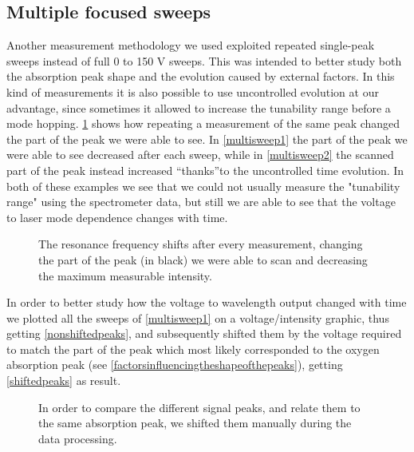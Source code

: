 	\subsection{Multiple focused sweeps}\label{focus}
Another measurement methodology we used exploited repeated single-peak sweeps instead of 
full 0 to 150 V sweeps. This was intended to better study both the absorption peak shape and the evolution caused by external factors. In this kind of measurements it is also possible to use uncontrolled evolution at our advantage, since sometimes it allowed to increase the tunability range before a mode hopping. \cref{multisweep} shows how repeating a measurement of the same peak changed the part of the peak we were able to see. In \cref{multisweep1} the part of the peak we were able to see decreased after each sweep, while in \cref{multisweep2} the scanned part of the peak instead increased \textquotedblleft thanks\textquotedblright to the uncontrolled time evolution.
In both of these examples we see that we could not usually measure the "tunability range" using the spectrometer data, but still we are able to see that the voltage to laser mode dependence changes with time. 

\begin{figure}[!phtb]\centering
{}
\caption{The resonance frequency shifts after every measurement, changing the part of the peak (in black) we were able to scan and decreasing the maximum measurable intensity.}
\label{multisweep}
\end{figure}

In order to better study how the voltage to wavelength output changed with time we plotted all the sweeps of \cref{multisweep1} on a voltage/intensity graphic, thus getting \cref{nonshiftedpeaks}, and subsequently shifted them by the voltage required to match the part of the peak which most likely corresponded to the oxygen absorption peak (see \cref{factorsinfluencingtheshapeofthepeaks}), getting \cref{shiftedpeaks} as result.

\begin{figure}
\caption{In order to compare the different signal peaks, and relate them to the same absorption peak, we shifted them manually during the data processing.}
\label{grafishifti}
\end{figure}

